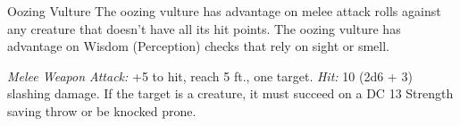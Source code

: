 \documentclass[10pt,a4paper,twoside,twocolumn,openany,bg=print,nodeprecatedcode]{dndbook}
\begin{document}
\begin{DndMonster}[float*=t]{Oozing Vulture}
\DndMonsterBasics[
armor-class = {13 (natural armor)},
hit-points = {\DndDice{10d8 + 10}},
speed = {20 ft., 50 ft. (key)}
]
\DndMonsterAbilityScores[
 str = 16,
 dex = 13,
 con = 12,
 int = 5,
 wis = 14,
 cha = 8
]
\DndMonsterDetails[
skills = {Perception +4, Stealth +3},
senses = {darkvision 60 ft., passive perception 14},
challenge = 2,
]
The oozing vulture has advantage on melee attack rolls against any creature that doesn't have all its hit points.
The oozing vulture has advantage on Wisdom (Perception) checks that rely on sight or smell.
\par
{}
\textsl{Melee Weapon Attack:} +5 to hit, reach 5 ft., one target. \textsl{Hit:} 10 (2d6 + 3) slashing damage. If the target is a creature, it must succeed on a DC 13 Strength saving throw or be knocked prone.
\end{DndMonster}


\clearpage
\end{document}
